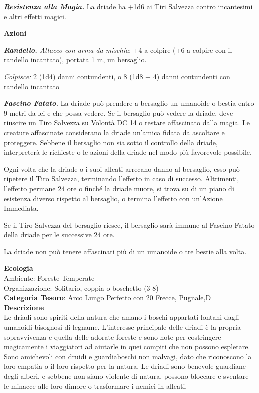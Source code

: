 \begin{multicols}{2}
{\emph{\textbf{Resistenza alla Magia.}} La driade ha +1d6 ai Tiri Salvezza contro incantesimi e altri effetti magici.


\textbf{Azioni}

\emph{\textbf{Randello.} Attacco con arma da mischia}: +4 a colpire (+6 a colpire con il randello incantato), portata 1 m, un bersaglio.

\emph{Colpisce:} 2 (1d4) danni contundenti, o 8 (1d8 + 4) danni contundenti con randello incantato

\emph{\textbf{Fascino Fatato.}} La driade può prendere a bersaglio un umanoide o bestia entro 9 metri da lei e che possa vedere. Se il bersaglio può vedere la driade, deve riuscire un Tiro Salvezza su Volontà DC 14 o restare affascinato dalla magia. Le creature affascinate considerano la driade un'amica fidata da ascoltare e proteggere. Sebbene il bersaglio non sia sotto il controllo della driade, interpreterà le richieste o le azioni della driade nel modo più favorevole possibile.

Ogni volta che la driade o i suoi alleati arrecano danno al bersaglio, esso può ripetere il Tiro Salvezza, terminando l'effetto in caso di successo. Altrimenti, l'effetto permane 24 ore o finché la driade muore, si trova su di un piano di esistenza diverso rispetto al bersaglio, o termina l'effetto con un'Azione Immediata.

Se il Tiro Salvezza del bersaglio riesce, il bersaglio sarà immune al Fascino Fatato della driade per le successive 24 ore.

La driade non può tenere affascinati più di un umanoide o tre bestie alla volta.

\textbf{Ecologia}\\
Ambiente: Foreste Temperate\\
Organizzazione: Solitario, coppia o boschetto (3-8)\\
\textbf{Categoria Tesoro}: Arco Lungo Perfetto con 20 Frecce, Pugnale,D\\
\textbf{Descrizione}\\
Le driadi sono spiriti della natura che amano i boschi appartati lontani dagli umanoidi bisognosi di legname. L'interesse principale delle driadi è la propria sopravvivenza e quella delle adorate foreste e sono note per costringere magicamente i viaggiatori ad aiutarle in quei compiti che non possono espletare.
Sono amichevoli con druidi e guardiaboschi non malvagi, dato che riconoscono la loro empatia o il loro rispetto per la natura.
Le driadi sono benevole guardiane degli alberi, e sebbene non siano violente di natura, possono bloccare e sventare le minacce alle loro dimore o trasformare i nemici in alleati.

}
\end{multicols}
